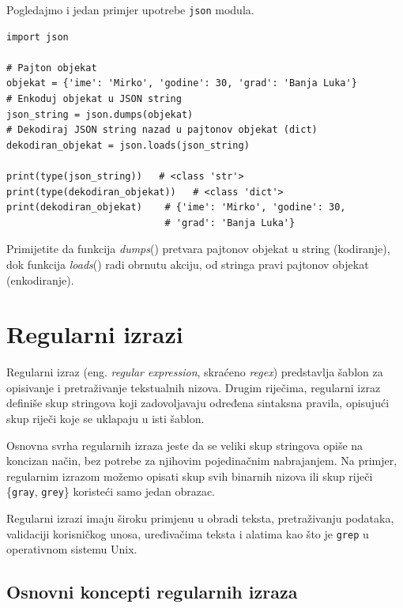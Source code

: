 Pogledajmo i jedan primjer upotrebe \texttt{json} modula. 

\begin{verbatim}
import json

# Pajton objekat
objekat = {'ime': 'Mirko', 'godine': 30, 'grad': 'Banja Luka'}
# Enkoduj objekat u JSON string
json_string = json.dumps(objekat)
# Dekodiraj JSON string nazad u pajtonov objekat (dict)
dekodiran_objekat = json.loads(json_string)

print(type(json_string))   # <class 'str'>
print(type(dekodiran_objekat))   # <class 'dict'>
print(dekodiran_objekat)    # {'ime': 'Mirko', 'godine': 30,
                            # 'grad': 'Banja Luka'}
\end{verbatim}


Primijetite da funkcija \textit{dumps}() pretvara pajtonov objekat u string (kodiranje), dok funkcija \textit{loads}() radi obrnutu akciju, od stringa pravi pajtonov objekat (enkodiranje). 

\section{Regularni izrazi}

Regularni izraz (eng. \textit{regular expression}, skraćeno \textit{regex}) predstavlja šablon za opisivanje i pretraživanje tekstualnih nizova. Drugim riječima, regularni izraz definiše skup stringova koji zadovoljavaju određena sintaksna pravila, opisujući skup riječi koje se uklapaju u isti šablon. 

Osnovna svrha regularnih izraza jeste da se veliki skup stringova opiše na koncizan način, bez potrebe za njihovim pojedinačnim nabrajanjem. Na primjer, regularnim izrazom možemo opisati skup svih binarnih nizova ili skup riječi \{\texttt{gray}, \texttt{grey}\} koristeći samo jedan obrazac.

Regularni izrazi imaju široku primjenu u obradi teksta, pretraživanju podataka, validaciji korisničkog unosa, uređivačima teksta i alatima kao što je \texttt{grep} u operativnom sistemu Unix.

\subsection{Osnovni koncepti regularnih izraza}

